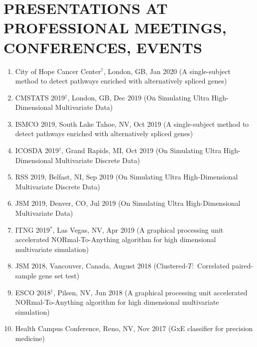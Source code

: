 \documentclass[paper=a4,fontsize=11pt]{scrartcl} %
\newcommand{\NewPart}[2]{\section*{\uppercase{#1} #2 }}
\newcommand{\TalkEntry}[4]{
		\noindent #1, #2, #3 #4}
\begin{document}

\NewPart{Presentations at professional meetings, conferences, events}{}
\vspace{-7pt}
\begin{enumerate}

\item \TalkEntry{City of Hope Cancer Center$^{\dagger}$}{London, GB}{Jan 2020}{(A single-subject method to detect pathways enriched with alternatively spliced genes)}
  
\item \TalkEntry{CMSTATS 2019$^{\dagger}$}{London, GB}{Dec 2019}{(On Simulating Ultra High-Dimensional Multivariate Data)}

\item \TalkEntry{ISMCO 2019}{South Lake Tahoe, NV}{Oct 2019}{(A single-subject method to detect pathways enriched with alternatively spliced genes)}
  
\item \TalkEntry{ICOSDA 2019$^{\dagger}$}{Grand Rapids, MI}{Oct 2019}{(On Simulating Ultra High-Dimensional Multivariate Discrete Data)}
  
\item \TalkEntry{RSS 2019}{Belfast, NI}{Sep 2019}{(On Simulating Ultra High-Dimensional Multivariate Discrete Data)}
  
\item \TalkEntry{JSM 2019}{Denver, CO}{Jul 2019}{(On Simulating Ultra High-Dimensional Multivariate Data)}
  
    \item \TalkEntry{ITNG 2019$^{*}$}{Las Vegas, NV}{Apr 2019}{(A graphical processing unit accelerated NORmal-To-Anything algorithm for high dimensional multivariate simulation)}
  
\item\TalkEntry{JSM 2018}{Vancouver, Canada}{August 2018}{(Clustered-$T$:~Correlated paired-sample gene set test)}

      \item \TalkEntry{ESCO 2018$^{\dagger}$}{Pilsen, NV}{Jun 2018}{(A graphical processing unit accelerated NORmal-To-Anything algorithm for high dimensional multivariate simulation)}

\item\TalkEntry{Health Campus Conference}{Reno, NV}{Nov 2017}{(GxE classifier for precision medicine)}
  

\end{enumerate}
\end{document}
